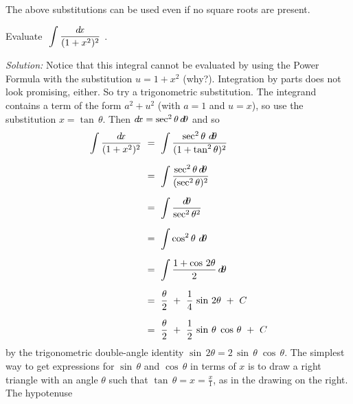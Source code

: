 The above substitutions can be used even if no square roots are present.
\newpage
\begin{exmp}\label{exmp:trigsub2}
\noindent Evaluate $~\displaystyle\int \frac{d\!x}{(1 + x^2)^2}~$.\vspace{1mm}
\par\noindent\emph{Solution:} Notice that this integral cannot be evaluated by
using the Power Formula with the substitution $u=1+x^2$ (why?). Integration by
parts does not look promising, either. So try a trigonometric substitution. The
integrand contains a term of the form $a^2 + u^2$ (with $a=1$ and $u=x$), so use
the substitution $x=\tan\,\theta$. Then $d\!x = \sec^2 \theta\,d\!\theta$ and so
\begin{align*}
\int \frac{d\!x}{(1 + x^2)^2} ~&=~ \int \frac{\sec^2 \theta~d\!\theta}{(1 + \tan^2 \theta)^2}\\[6pt]
&=~ \int \frac{\sec^2 \theta\,d\!\theta}{(\sec^2 \theta)^2}\\[6pt]
&=~ \int \frac{d\!\theta}{\sec^2 \theta^2}\\[6pt]
&=~ \int \cos^2 \theta~d\!\theta\\[6pt]
&=~ \int \frac{1 + \cos\,2\theta}{2}\,d\!\theta\\[6pt]
&=~ \frac{\theta}{2} ~+~ \frac{1}{4}\,\sin\,2\theta ~+~ C\\[6pt]
&=~ \frac{\theta}{2} ~+~ \frac{1}{2}\,\sin\,\theta\;\cos\,\theta ~+~ C
\end{align*}
by the trigonometric double-angle identity
$\sin\,2\theta = 2\,\sin\,\theta\;\cos\,\theta$.
The simplest way to get expressions for $\sin\,\theta$ and $\cos\,\theta$ in
terms of $x$ is to draw a right triangle with an angle $\theta$ such that
$\tan\,\theta = x = \frac{x}{1}$, as in the drawing on the right. The hypotenuse

\end{exmp}
